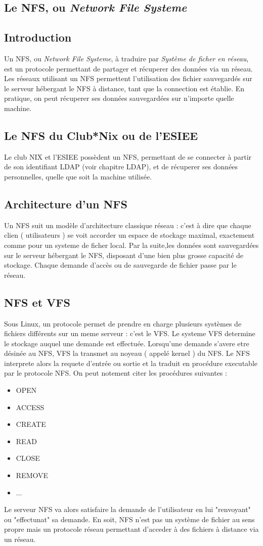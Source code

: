 \usepackage[french]{babel}
\subsection{Le NFS, ou \textit{Network File Systeme}}
\subsection{Introduction}
Un NFS, ou \textit{Network File Systeme}, à traduire par \textit{Système de ficher en réseau}, est un protocole permettant de partager et récuperer des données via un réseau. Les réseaux utilisant un NFS permettent l'utilisation des fichier sauvegardés sur le serveur hébergant le NFS à distance, tant que la connection est établie. En pratique, on peut récuperer ses données sauvegardées sur n'importe quelle machine.
\subsection{Le NFS du Club*Nix ou de l'ESIEE}
Le club NIX et l'ESIEE possèdent un NFS, permettant de se connecter à partir de son identifiant LDAP (voir chapitre LDAP), et de récuperer ses données personnelles, quelle que soit la machine utilisée.
\subsection{Architecture d'un NFS}
Un NFS suit un modèle d'architecture classique réseau : c'est à dire que chaque clien ( utilisateurs ) se voit accorder un espace de stockage maximal, exactement comme pour un systeme de ficher local. Par la suite,les données sont sauvegardées sur le serveur hébergant le NFS, disposant d'une bien plus grosse capacité de stockage. Chaque demande d'accès ou de sauvegarde de fichier passe par le réseau.
\subsection{NFS et VFS}
Sous Linux, un protocole permet de prendre en charge plusieurs systèmes de fichiers différents sur un meme serveur : c'est le VFS. Le systeme VFS determine le stockage auquel une demande est effectuée.
Lorsqu'une demande s'avere etre désinée au NFS, VFS la transmet au noyeau ( appelé kernel ) du NFS. Le NFS interprete alors la requete d'entrée ou sortie et la traduit en procédure executable par le protocole NFS. On peut notement citer les procédures suivantes :
\begin{itemize}
  \item OPEN
  \item ACCESS
  \item CREATE
  \item READ
  \item CLOSE
  \item REMOVE
  \item ...
\end{itemize}
Le serveur NFS va alors satisfaire la demande de l'utilisateur en lui "renvoyant" ou "effectunat" sa demande.
En soit, NFS n'est pas un système de fichier au sens propre mais un protocole réseau permettant d'acceder à des fichiers à distance via un réseau.
